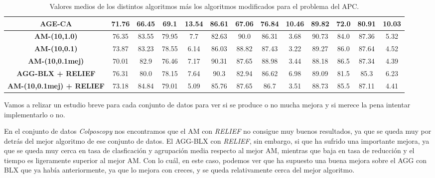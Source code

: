 \documentclass[11pt,a4paper]{article}
\begin{document}
\begin{table}[H]
{\begin{tabular}{c|c|c|c|c|c|c|c|c|c|c|c|c|}
\multicolumn{1}{|c|}{\textbf{AGE-CA}}                  & 71.76             & 66.45                   & 69.1          & 13.54      & 86.61             & 67.06          & 76.84         & 10.46      & 89.82             & 72.0           & 80.91         & 10.03      \\ \hline
\multicolumn{1}{|c|}{\textbf{AM-(10,1.0)}}             & 76.35             & 83.55                   & 79.95         & 7.7        & 82.63             & 90.0           & 86.31         & 3.68       & 90.73             & 84.0           & 87.36         & 5.32       \\ \hline
\multicolumn{1}{|c|}{\textbf{AM-(10,0.1)}}             & 73.87             & 83.23                   & 78.55         & 6.14       & 86.03             & 88.82          & 87.43         & 3.22       & 89.27             & 86.0           & 87.64         & 4.52       \\ \hline
\multicolumn{1}{|c|}{\textbf{AM-(10,0.1mej)}}          & 70.01             & 82.9                    & 76.46         & 7.17       & 90.31             & 87.65          & 88.98         & 3.44       & 88.18             & 86.5           & 87.34         & 4.39       \\ \hline
\multicolumn{1}{|c|}{\textbf{AGG-BLX + RELIEF}}        & 76.31             & 80.0                    & 78.15         & 7.64       & 90.3              & 82.94          & 86.62         & 6.98       & 89.09             & 81.5           & 85.3          & 6.23       \\ \hline
\multicolumn{1}{|c|}{\textbf{AM-(10,0.1mej) + RELIEF}} & 73.18             & 84.84                   & 79.01         & 5.09       & 85.76             & 87.65          & 86.7          & 3.51       & 88.73             & 85.5           & 87.11         & 4.41       \\ \hline
\end{tabular}
}%
\caption{Valores medios de los distintos algoritmos más los algoritmos modificados para el problema del APC.}
\end{table}

Vamos a relizar un estudio breve para cada conjunto de datos para ver si se produce o no mucha mejora y si merece la pena intentar
implementarlo o no.

En el conjunto de datos \textit{Colposcopy} nos encontramos que el AM con \textit{RELIEF} no consigue muy buenos resultados,
ya que se queda muy por detrás del mejor algoritmo de ese conjunto de datos. El AGG-BLX con \textit{RELIEF}, sin embargo, si
que ha sufrido una importante mejora, ya que se queda muy cerca en tasa de clasficación y agrupación media respecto al mejor AM,
mientras que baja en tasa de reducción y el tiempo es ligeramente superior al mejor AM. Con lo cuál, en este caso, podemos ver
que ha supuesto una buena mejora sobre el AGG con BLX que ya había anteriormente, ya que lo mejora con creces, y se queda
relativamente cerca del mejor algoritmo.
\end{document}
